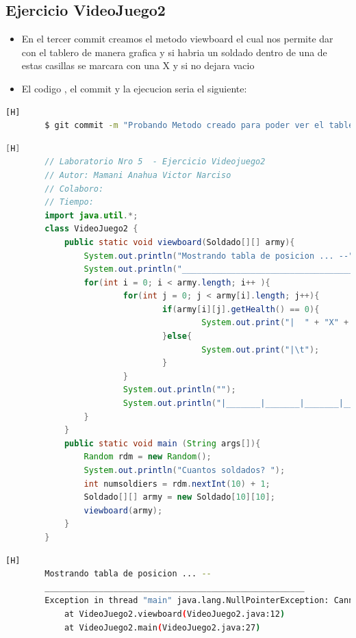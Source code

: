 \documentclass{article}
\begin{document}
	\subsection{Ejercicio VideoJuego2}
	\begin{itemize}	
		\item En el tercer commit creamos el metodo viewboard el cual nos permite dar con el tablero de manera grafica y si habria un soldado dentro de una de estas casillas se marcara con una X y si no dejara vacio 
		\item El codigo , el commit y la ejecucion seria el siguiente:
	\end{itemize}	
	\begin{lstlisting}[language=bash,caption={Commit}][H]
		$ git commit -m "Probando Metodo creado para poder ver el tablero para los soldados el cual si habria un soldado este se marcara con una X"
	\end{lstlisting}	
	\begin{lstlisting}[language=java,caption={Las lineas de codigos del metodo creado:}][H]
		// Laboratorio Nro 5  - Ejercicio Videojuego2
		// Autor: Mamani Anahua Victor Narciso
		// Colaboro:
		// Tiempo:
		import java.util.*;
		class VideoJuego2 {
			public static void viewboard(Soldado[][] army){
				System.out.println("Mostrando tabla de posicion ... --");
				System.out.println("_____________________________________________________");
				for(int i = 0; i < army.length; i++ ){
						for(int j = 0; j < army[i].length; j++){
								if(army[i][j].getHealth() == 0){
										System.out.print("|  " + "X" + "  ");
								}else{
										System.out.print("|\t");
								}
						}
						System.out.println("");
						System.out.println("|_______|_______|_______|_______|_______|_______|_______|_______|_______|_______|");
				}
			}
			public static void main (String args[]){
				Random rdm = new Random();
				System.out.println("Cuantos soldados? ");
				int numsoldiers = rdm.nextInt(10) + 1;
				Soldado[][] army = new Soldado[10][10];
				viewboard(army);
			}
		}
	\end{lstlisting}
	\begin{lstlisting}[language=bash,caption={Ejecucion:}][H]
		Mostrando tabla de posicion ... --
		_____________________________________________________
		Exception in thread "main" java.lang.NullPointerException: Cannot invoke "Soldado.getHealth()" because "<parameter1>[<local1>][<local2>]" is null
			at VideoJuego2.viewboard(VideoJuego2.java:12)
			at VideoJuego2.main(VideoJuego2.java:27)
	\end{lstlisting}
\end{document}
